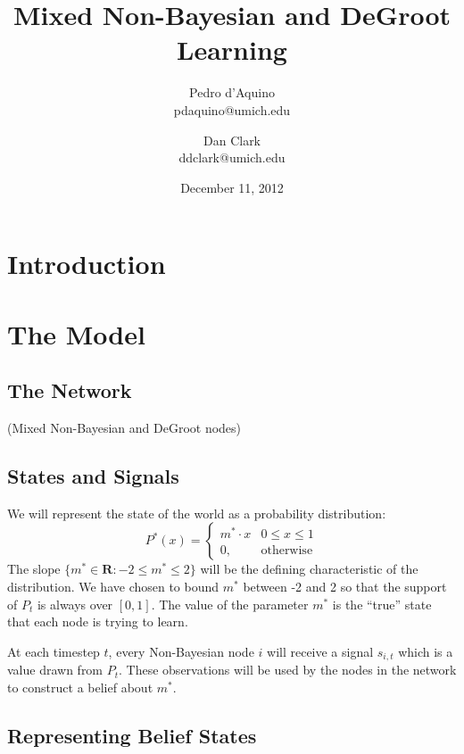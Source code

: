 \documentclass[a4paper,12pt]{article}
\begin{document}
\title{Mixed Non-Bayesian and DeGroot Learning}
\author{Pedro d'Aquino\\pdaquino@umich.edu \and Dan Clark\\ddclark@umich.edu}
\date{December 11, 2012}

\maketitle

\section{Introduction}

\section{The Model}

\subsection{The Network}

(Mixed Non-Bayesian and DeGroot nodes)

\subsection{States and Signals}

We will represent the state of the world as a probability distribution:
\begin{equation}
P^*(x)=\begin{cases}
m^* \cdot x & 0 \le x \le 1 \\
0, & \text{otherwise}
\end{cases}
\end{equation}
The slope $\{ m^* \in \mathbf{R} : -2 \le m^* \le 2 \}$ will be the defining characteristic of the distribution.  We have chosen to bound $m^*$ between -2 and 2 so that the support of $P_t$  is always over $[0,1]$.  The value of the parameter $m^*$ is the ``true'' state that each node is trying to learn.

At each timestep $t$, every Non-Bayesian node $i$ will receive a signal $s_{i,t}$ which is a value drawn from $P_t$.  These observations will be used by the nodes in the network to construct a belief about $m^*$.

\subsection{Representing Belief States}
\end{document}

